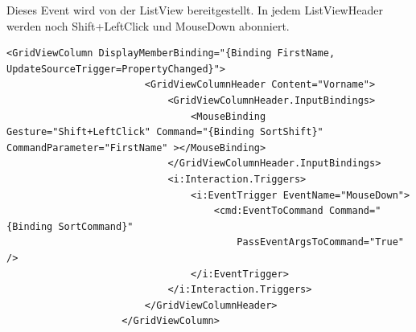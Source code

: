 Dieses Event wird von der ListView bereitgestellt.
In jedem ListViewHeader werden noch Shift+LeftClick und MouseDown abonniert.
\begin{lstlisting}
<GridViewColumn DisplayMemberBinding="{Binding FirstName, UpdateSourceTrigger=PropertyChanged}">
                        <GridViewColumnHeader Content="Vorname">
                            <GridViewColumnHeader.InputBindings>
                                <MouseBinding Gesture="Shift+LeftClick" Command="{Binding SortShift}" CommandParameter="FirstName" ></MouseBinding>
                            </GridViewColumnHeader.InputBindings>
                            <i:Interaction.Triggers>
                                <i:EventTrigger EventName="MouseDown">
                                    <cmd:EventToCommand Command="{Binding SortCommand}"
                                        PassEventArgsToCommand="True" />
                                </i:EventTrigger>
                            </i:Interaction.Triggers>
                        </GridViewColumnHeader>
                    </GridViewColumn>
\end{lstlisting}

